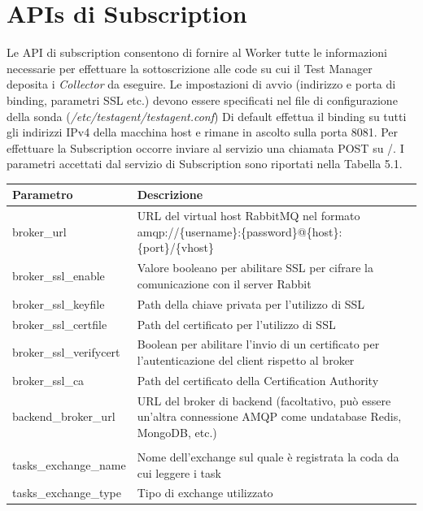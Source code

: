 \documentclass[../main.tex]{subfiles}
\begin{document}
\section{APIs di Subscription}
Le API di subscription consentono di fornire al Worker tutte le informazioni necessarie per effettuare la sottoscrizione alle code su cui il Test Manager deposita i \textit{Collector} da eseguire.
Le impostazioni di avvio (indirizzo e porta di binding, parametri SSL etc.) devono essere specificati nel file di configurazione della sonda (\textit{/etc/testagent/testagent.conf})
Di default effettua il binding su tutti gli indirizzi IPv4 della macchina host e rimane in ascolto sulla porta 8081.
Per effettuare la Subscription occorre inviare al servizio una chiamata POST su /.
I parametri accettati dal servizio di Subscription sono riportati nella Tabella 5.1.
\begin{table}[h]
\centering
\begin{tabular}{| m{4.4cm}| m{9cm} | }
\hline
\textbf{Parametro} & \textbf{Descrizione} \\ \hline
broker\_url & URL del virtual host RabbitMQ nel formato \newline amqp://\{username\}:\{password\}@\{host\}:\{port\}/\newline\{vhost\} \\ \hline
broker\_ssl\_enable & Valore booleano per abilitare SSL per cifrare la comunicazione con il server Rabbit \\ \hline
broker\_ssl\_keyfile & Path della chiave privata per l'utilizzo di SSL \\ \hline
broker\_ssl\_certfile & Path del certificato per l'utilizzo di SSL \\ \hline
broker\_ssl\_verifycert & Boolean per abilitare l'invio di un certificato per l'autenticazione del client rispetto al broker \\ \hline
broker\_ssl\_ca & Path del certificato della Certification Authority \\ \hline
backend\_broker\_url & URL del broker di backend (facoltativo, può \newline essere un'altra connessione AMQP come un\newline database Redis, MongoDB, etc.) \\ \hline
 &  \\ \hline
tasks\_exchange\_name & Nome dell'exchange sul quale è registrata la coda da cui leggere i task \\ \hline
tasks\_exchange\_type & Tipo di exchange utilizzato \\ \hline

\end{tabular}
\end{table}
\end{document}
